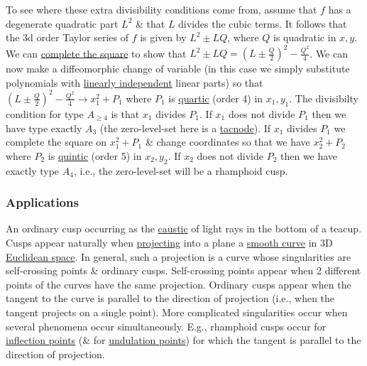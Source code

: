 \documentclass{article}
\begin{document}
To see where these extra divisibility conditions come from, assume that $f$ has a degenerate quadratic part $L^2$ \& that $L$ divides the cubic terms. It follows that the 3d order Taylor series of $f$ is given by $L^2\pm LQ$, where $Q$ is quadratic in $x,y$. We can \href{https://en.wikipedia.org/wiki/Complete_the_square}{complete the square} to show that $L^2\pm LQ = \left(L\pm\frac{Q}{2}\right)^2 - \frac{Q^2}{4}$. We can now make a diffeomorphic change of variable (in this case we simply substitute polynomials with \href{https://en.wikipedia.org/wiki/Linearly_independent}{linearly independent} linear parts) so that $\left(L\pm\frac{Q}{2}\right)^2 - \frac{Q^2}{4}\to x_1^2 + P_1$ where $P_1$ is \href{https://en.wikipedia.org/wiki/Quartic_polynomial}{quartic} (order 4) in $x_1,y_1$. The divisibilty condition for type $A_{\ge4}$ is that $x_1$ divides $P_1$. If $x_1$ does not divide $P_1$ then we have type exactly $A_3$ (the zero-level-set here is a \href{https://en.wikipedia.org/wiki/Tacnode}{tacnode}). If $x_1$ divides $P_1$ we complete the square on $x_1^2 + P_1$ \& change coordinates so that we have $x_2^2 + P_2$ where $P_2$ is \href{https://en.wikipedia.org/wiki/Quintic_polynomial}{quintic} (order 5) in $x_2,y_2$. If $x_2$ does not divide $P_2$ then we have exactly type $A_4$, i.e., the zero-level-set will be a rhamphoid cusp.

\subsubsection{Applications}
{\sf An ordinary cusp occurring as the \href{https://en.wikipedia.org/wiki/Caustic_(optics)}{caustic} of light rays in the bottom of a teacup.} Cusps appear naturally when \href{https://en.wikipedia.org/wiki/Projection_(mathematics)}{projecting} into a plane a \href{https://en.wikipedia.org/wiki/Smooth_curve}{smooth curve} in 3D \href{https://en.wikipedia.org/wiki/Euclidean_space}{Euclidean space}. In general, such a projection is a curve whose singularities are self-crossing points \& ordinary cusps. Self-crossing points appear when 2 different points of the curves have the same projection. Ordinary cusps appear when the tangent to the curve is parallel to the direction of projection (i.e., when the tangent projects on a single point). More complicated singularities occur when several phenomena occur simultaneously. E.g., rhamphoid cusps occur for \href{https://en.wikipedia.org/wiki/Inflection_point}{inflection points} (\& for \href{https://en.wikipedia.org/wiki/Undulation_point}{undulation points}) for which the tangent is parallel to the direction of projection.
\end{document}

